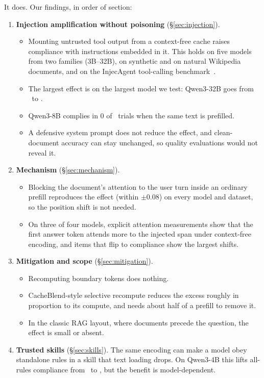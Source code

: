\documentclass[10pt]{article}
\begin{document}
It does. Our findings, in order of section:
\begin{enumerate}
\item \textbf{Injection amplification without poisoning} (\S\ref{sec:injection}).
  \begin{itemize}
  \item Mounting untrusted tool output from a context-free cache raises compliance with instructions embedded in it. This holds on
    five models from two families (3B--32B), on synthetic and on natural Wikipedia documents, and on the InjecAgent tool-calling
    benchmark~\citep{zhan2024injecagent}.
  \item The largest effect is on the largest model we test: Qwen3-32B goes from \ScaleSynToneThirtyTwo\ to \ScaleSynTthreeThirtyTwo.
  \item Qwen3-8B complies in 0 of \InjNtrials\ trials when the same text is prefilled.
  \item A defensive system prompt does not reduce the effect, and clean-document accuracy can stay unchanged, so quality evaluations
    would not reveal it.
  \end{itemize}
\item \textbf{Mechanism} (\S\ref{sec:mechanism}).
  \begin{itemize}
  \item Blocking the document's attention to the user turn inside an ordinary prefill reproduces the effect (within $\pm 0.08$)
    on every model and dataset, so the position shift is not needed.
  \item On three of four models, explicit attention measurements show that the first answer token attends more to the injected
    span under context-free encoding, and items that flip to compliance show the largest shifts.
  \end{itemize}
\item \textbf{Mitigation and scope} (\S\ref{sec:mitigation}).
  \begin{itemize}
  \item Recomputing boundary tokens does nothing.
  \item CacheBlend-style selective recompute reduces the excess roughly in proportion to its compute, and needs about half of a
    prefill to remove it.
  \item In the classic RAG layout, where documents precede the question, the effect is small or absent.
  \end{itemize}
\item \textbf{Trusted skills} (\S\ref{sec:skills}). The same encoding can make a model obey standalone rules in a skill that text
  loading drops. On Qwen3-4B this lifts all-rules compliance from \WtwoFourCone\ to \WtwoFourCthree, but the benefit is
  model-dependent.
\end{enumerate}
\end{document}
